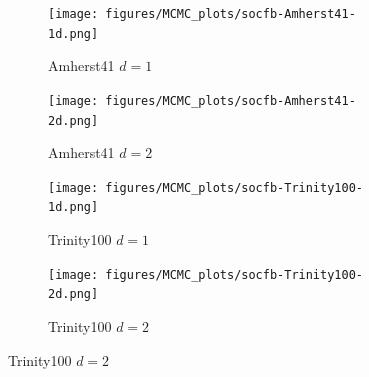 \begin{figure}
  \centering

  \begin{subfigure}{0.49\textwidth}
    \centering
    \texttt{[image: figures/MCMC\_plots/socfb-Amherst41-1d.png]}
    \caption{Amherst41 $d=1$}
  \end{subfigure}
  \hfill
  \begin{subfigure}{0.49\textwidth}
    \centering
    \texttt{[image: figures/MCMC\_plots/socfb-Amherst41-2d.png]}
    \caption{Amherst41 $d=2$}
  \end{subfigure}

  \vspace{1em}

  \begin{subfigure}{0.49\textwidth}
    \centering
    \texttt{[image: figures/MCMC\_plots/socfb-Trinity100-1d.png]}
    \caption{Trinity100 $d=1$}
  \end{subfigure}
  \hfill
  \begin{subfigure}{0.49\textwidth}
    \centering
    \texttt{[image: figures/MCMC\_plots/socfb-Trinity100-2d.png]}
    \caption{Trinity100 $d=2$}
  \end{subfigure}


\end{figure}
